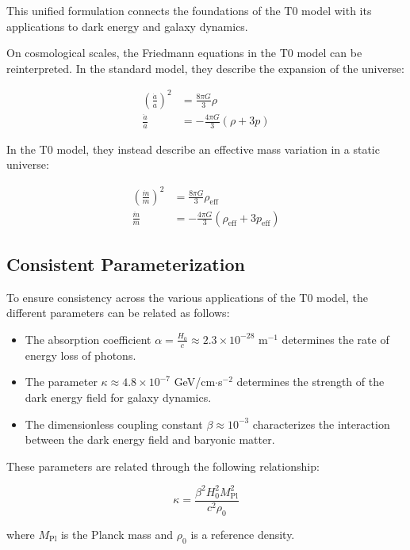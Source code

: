 \documentclass[a4paper,12pt]{article}
\theoremstyle{definition}
\theoremstyle{remark}
\begin{document}
	This unified formulation connects the foundations of the T0 model with its applications to dark energy and galaxy dynamics.
	
	On cosmological scales, the Friedmann equations in the T0 model can be reinterpreted. In the standard model, they describe the expansion of the universe:
	
	\begin{align}
		\left(\frac{\dot{a}}{a}\right)^2 &= \frac{8\pi G}{3}\rho \\
		\frac{\ddot{a}}{a} &= -\frac{4\pi G}{3}(\rho + 3p)
	\end{align}
	
	In the T0 model, they instead describe an effective mass variation in a static universe:
	
	\begin{align}
		\left(\frac{\dot{m}}{m}\right)^2 &= \frac{8\pi G}{3}\rho_{\text{eff}} \\
		\frac{\ddot{m}}{m} &= -\frac{4\pi G}{3}(\rho_{\text{eff}} + 3p_{\text{eff}})
	\end{align}
	
	\subsection{Consistent Parameterization}
	
	To ensure consistency across the various applications of the T0 model, the different parameters can be related as follows:
	
	\begin{itemize}
		\item The absorption coefficient $\alpha = \frac{H_{0}}{c} \approx 2.3 \times 10^{-28}$ m$^{-1}$ determines the rate of energy loss of photons.
		\item The parameter $\kappa \approx 4.8 \times 10^{-7}$ GeV/cm$\cdot$s$^{-2}$ determines the strength of the dark energy field for galaxy dynamics.
		\item The dimensionless coupling constant $\beta \approx 10^{-3}$ characterizes the interaction between the dark energy field and baryonic matter.
	\end{itemize}
	
	These parameters are related through the following relationship:
	
	\begin{equation}
		\kappa = \frac{\beta^2 H_0^2 M_{\text{Pl}}^2}{c^2 \rho_0}
	\end{equation}
	
	where $M_{\text{Pl}}$ is the Planck mass and $\rho_0$ is a reference density.
	
\end{document}
